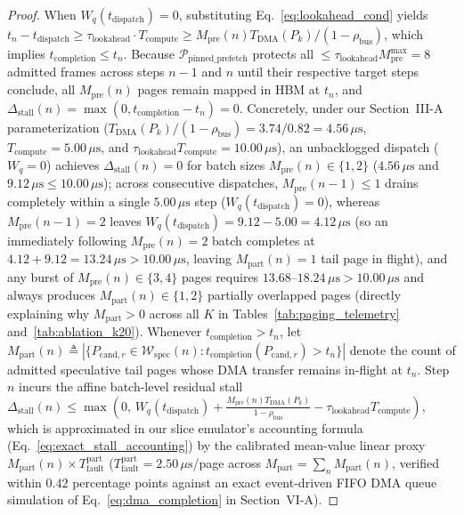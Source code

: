 \documentclass[conference,10pt]{IEEEtran}
\begin{document}
\begin{proof}
When $W_q(t_{\text{dispatch}}) = 0$, substituting Eq.~\eqref{eq:lookahead_cond} yields $t_n - t_{\text{dispatch}} \ge \tau_{\text{lookahead}} \cdot T_{\text{compute}} \ge M_{\text{pre}}(n) T_{\text{DMA}}(P_k) / (1 - \rho_{\text{bus}})$, which implies $t_{\text{completion}} \le t_n$. Because $\mathcal{P}_{\text{pinned\_prefetch}}$ protects all $\le \tau_{\text{lookahead}}M_{\text{pre}}^{\max} = 8$ admitted frames across steps $n-1$ and $n$ until their respective target steps conclude, all $M_{\text{pre}}(n)$ pages remain mapped in HBM at $t_n$, and $\Delta_{\text{stall}}(n) = \max(0, t_{\text{completion}} - t_n) = 0$. Concretely, under our Section~III-A parameterization ($T_{\text{DMA}}(P_k)/(1-\rho_{\text{bus}}) = 3.74/0.82 = 4.56\,\mu\text{s}$, $T_{\text{compute}} = 5.00\,\mu\text{s}$, and $\tau_{\text{lookahead}}T_{\text{compute}} = 10.00\,\mu\text{s}$), an unbacklogged dispatch ($W_q = 0$) achieves $\Delta_{\text{stall}}(n) = 0$ for batch sizes $M_{\text{pre}}(n) \in \{1, 2\}$ ($4.56\,\mu\text{s}$ and $9.12\,\mu\text{s} \le 10.00\,\mu\text{s}$); across consecutive dispatches, $M_{\text{pre}}(n-1) \le 1$ drains completely within a single $5.00\,\mu\text{s}$ step ($W_q(t_{\text{dispatch}}) = 0$), whereas $M_{\text{pre}}(n-1) = 2$ leaves $W_q(t_{\text{dispatch}}) = 9.12 - 5.00 = 4.12\,\mu\text{s}$ (so an immediately following $M_{\text{pre}}(n) = 2$ batch completes at $4.12 + 9.12 = 13.24\,\mu\text{s} > 10.00\,\mu\text{s}$, leaving $M_{\text{part}}(n) = 1$ tail page in flight), and any burst of $M_{\text{pre}}(n) \in \{3, 4\}$ pages requires $13.68\text{--}18.24\,\mu\text{s} > 10.00\,\mu\text{s}$ and always produces $M_{\text{part}}(n) \in \{1, 2\}$ partially overlapped pages (directly explaining why $M_{\text{part}} > 0$ across all $K$ in Tables~\ref{tab:paging_telemetry} and~\ref{tab:ablation_k20}). Whenever $t_{\text{completion}} > t_n$, let $M_{\text{part}}(n) \triangleq |\{P_{\text{cand}, r} \in \mathcal{W}_{\text{spec}}(n) : t_{\text{completion}}(P_{\text{cand}, r}) > t_n\}|$ denote the count of admitted speculative tail pages whose DMA transfer remains in-flight at $t_n$. Step $n$ incurs the affine batch-level residual stall $\Delta_{\text{stall}}(n) \le \max\!\left(0,\, W_q(t_{\text{dispatch}}) + \frac{M_{\text{pre}}(n)T_{\text{DMA}}(P_k)}{1-\rho_{\text{bus}}} - \tau_{\text{lookahead}} T_{\text{compute}}\right)$, which is approximated in our slice emulator's accounting formula (Eq.~\eqref{eq:exact_stall_accounting}) by the calibrated mean-value linear proxy $M_{\text{part}}(n) \times T_{\text{fault}}^{\text{part}}$ ($T_{\text{fault}}^{\text{part}} = 2.50\,\mu\text{s}$/page across $M_{\text{part}} = \sum_n M_{\text{part}}(n)$, verified within $0.42$ percentage points against an exact event-driven FIFO DMA queue simulation of Eq.~\eqref{eq:dma_completion} in Section~VI-A).
\end{proof}
\end{document}
